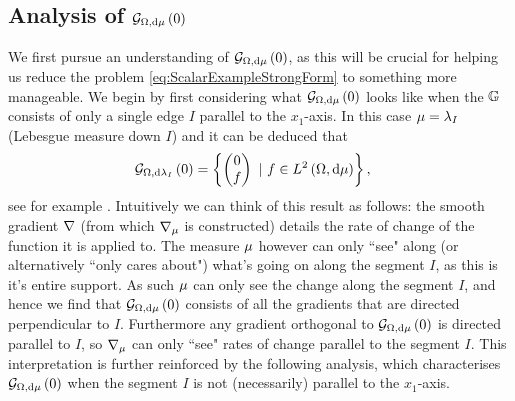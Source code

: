 \subsection{Analysis of $\mathcal{G}_{ \Omega, \mathrm{d}\mu}\left( 0 \right)$}
We first pursue an understanding of $\mathcal{G}_{ \Omega, \mathrm{d}\mu}\left( 0 \right)$, as this will be crucial for helping us reduce the problem \eqref{eq:ScalarExampleStrongForm} to something more manageable.
We begin by first considering what $\mathcal{G}_{ \Omega, \mathrm{d}\mu}\left( 0 \right)$ looks like when the $\mathbb{G}$ consists of only a single edge $I$ parallel to the $x_1$-axis.
In this case $\mu = \lambda_I$ (Lebesgue measure down $I$) and it can be deduced that 
\begin{align*}
	\mathcal{G}_{ \Omega, \mathrm{d}\lambda_I}\left( 0 \right) &= 
	\left\{ 
		\begin{pmatrix} 0 \\ f	\end{pmatrix}
		\ \vert \ f\in L^{2}\left( \Omega,\mathrm{d}\mu \right)
	 \right\},
\end{align*}
see for example \cite{zhikov2000extension}.
Intuitively we can think of this result as follows: the smooth gradient $\nabla$ (from which $\nabla_\mu$ is constructed) details the rate of change of the function it is applied to.
The measure $\mu$ however can only ``see" along (or alternatively ``only cares about") what's going on along the segment $I$, as this is it's entire support.
As such $\mu$ can only see the change along the segment $I$, and hence we find that $\mathcal{G}_{ \Omega, \mathrm{d}\mu}\left( 0 \right)$ consists of all the gradients that are directed perpendicular to $I$.
Furthermore any gradient orthogonal to $\mathcal{G}_{ \Omega, \mathrm{d}\mu}\left( 0 \right)$ is directed parallel to $I$, so $\nabla_\mu$ can only ``see" rates of change parallel to the segment $I$.
This interpretation is further reinforced by the following analysis, which characterises $\mathcal{G}_{ \Omega, \mathrm{d}\mu}\left( 0 \right)$ when the segment $I$ is not (necessarily) parallel to the $x_1$-axis. \newline

